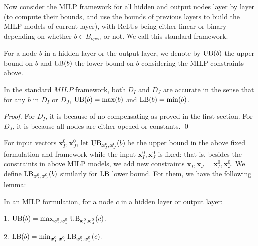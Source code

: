 			Now consider the MILP framework for all hidden and output nodes layer by layer (to compute their bounds, and use the bounds of previous layers to build the MILP models of current layer), with ReLUs being either linear or binary depending on whether $b \in B_{open}$ or not. We call this standard framework.
			
			For a node $b$ in a hidden layer or the output layer, we denote by $\mathrm{UB}(b)$ the upper bound on $b$ and $\mathrm{LB}(b)$ the lower bound on $b$ considering the MILP constraints above.
			
			
			\begin{lemma}
				In the standard $MILP$ framework, both $D_I$ and $D_J$ are accurate in the sense that for any $b$ in $D_I$ or $D_J$, $\mathrm{UB}(b)=\max(b)$ and $\mathrm{LB}(b)=\min(b)$.
			\end{lemma}
			
			\begin{proof}
				For $D_I$, it is because of no compensating as proved in the first section. For $D_J$, it is because all nodes are either opened or constants. \qed
			\end{proof}
			
			
			
			
			For input vectors $\boldsymbol{x}^0_I,\boldsymbol{x}^0_J$, let $\mathrm{UB}_{\boldsymbol{x}^0_I,\boldsymbol{x}^0_J}(b)$ be the upper bound in the above fixed formulation and framework while the input $\boldsymbol{x}^0_I,\boldsymbol{x}^0_J$ is fixed: that is, besides the constraints in above MILP models, we add new constraints $\boldsymbol{x}_I,\boldsymbol{x}_J=\boldsymbol{x}^0_I,\boldsymbol{x}^0_J$. We  define $\mathrm{LB}_{\boldsymbol{x}^0_I,\boldsymbol{x}^0_J}(b)$ similarly for $\mathrm{LB}$ lower bound. For them, we have the following lemma:
			
			\begin{lemma} In an MILP formulation, for a node $c$ in a hidden layer or output layer:
				
				1. $\mathrm{UB}(b)=\max_{\boldsymbol{x}^0_I,\boldsymbol{x}^0_J}\mathrm{UB}_{\boldsymbol{x}^0_I,\boldsymbol{x}^0_J}(c)$. 
				
				2. $\mathrm{LB}(b)=\min_{\boldsymbol{x}^0_I,\boldsymbol{x}^0_J}\mathrm{LB}_{\boldsymbol{x}^0_I,\boldsymbol{x}^0_J}(c)$. 
			\end{lemma}
			
